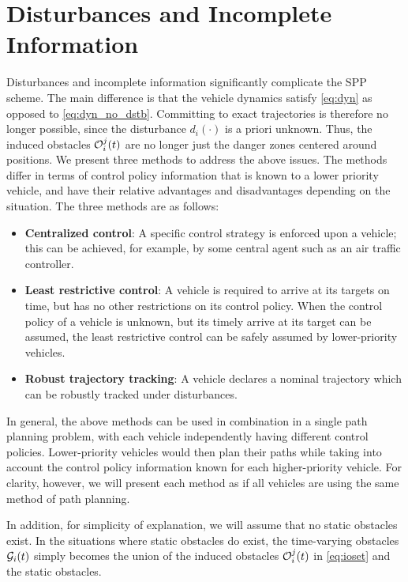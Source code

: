\section{Disturbances and Incomplete Information \label{sec:obs_gen}}
Disturbances and incomplete information significantly complicate the SPP scheme. The main difference is that the vehicle dynamics satisfy \eqref{eq:dyn} as opposed to \eqref{eq:dyn_no_dstb}. Committing to exact trajectories is therefore no longer possible, since the disturbance $d_i(\cdot)$ is a priori unknown. Thus, the induced obstacles $\mathcal{O}_i^j(t)$ are no longer just the danger zones centered around positions. We present three methods to address the above issues. The methods differ in terms of control policy information that is known to a lower priority vehicle, and have their relative advantages and disadvantages depending on the situation. The three methods are as follows:
\begin{itemize}
\item \textbf{Centralized control}: A specific control strategy is enforced upon a vehicle; this can be achieved, for example, by some central agent such as an air traffic controller.
\item \textbf{Least restrictive control}: A vehicle is required to arrive at its targets on time, but has no other restrictions on its control policy. When the control policy of a vehicle is unknown, but its timely arrive at its target can be assumed, the least restrictive control can be safely assumed by lower-priority vehicles.
\item \textbf{Robust trajectory tracking}: A vehicle declares a nominal trajectory which can be robustly tracked under disturbances.
\end{itemize}

In general, the above methods can be used in combination in a single path planning problem, with each vehicle independently having different control policies. Lower-priority vehicles would then plan their paths while taking into account the control policy information known for each higher-priority vehicle. For clarity, however, we will present each method as if all vehicles are using the same method of path planning.

In addition, for simplicity of explanation, we will assume that no static obstacles exist. In the situations where static obstacles do exist, the time-varying obstacles $\mathcal{G}_i(t)$ simply becomes the union of the induced obstacles $\mathcal{O}_i^j(t)$ in \eqref{eq:ioset} and the static obstacles.

